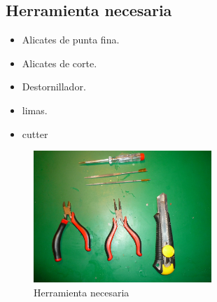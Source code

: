 	\subsection{Herramienta necesaria}
		\begin{itemize}
			\item Alicates de punta fina.
			\item Alicates de corte.
			\item Destornillador.
			\item limas.
			\item cutter
		\end{itemize}
		\begin{figure}[!htp]
			\centering
			\includegraphics[width=0.6\textwidth]{../../Fotos/47.jpg}
			\caption{Herramienta necesaria}
		\end{figure}
	\newpage{}
